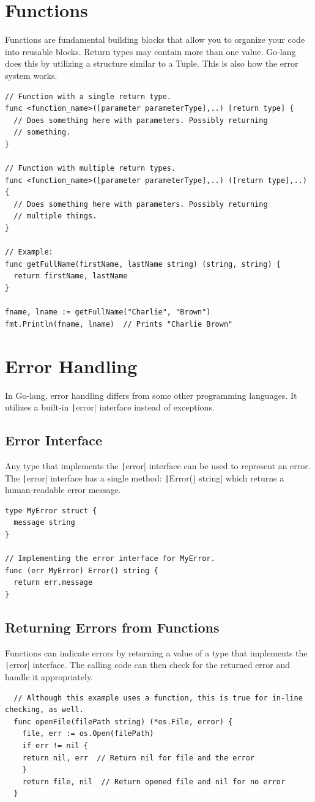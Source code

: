 \documentclass[letterpaper,12pt]{article}
\begin{document}
\newpage

\section{Functions}
Functions are fundamental building blocks that allow you to organize your code into reusable blocks. Return types may contain more than one value. Go-lang does this by utilizing a structure similar to a Tuple. This is also how the error system works.
\begin{verbatim}
// Function with a single return type.
func <function_name>([parameter parameterType],..) [return type] {
  // Does something here with parameters. Possibly returning
  // something.
}

// Function with multiple return types.
func <function_name>([parameter parameterType],..) ([return type],..) {
  // Does something here with parameters. Possibly returning
  // multiple things.
}

// Example:
func getFullName(firstName, lastName string) (string, string) {
  return firstName, lastName
}

fname, lname := getFullName("Charlie", "Brown")
fmt.Println(fname, lname)  // Prints "Charlie Brown"
\end{verbatim}
\section{Error Handling}
In Go-lang, error handling differs from some other programming languages. It utilizes a built-in \texttt|error| interface instead of exceptions.
\subsection{Error Interface}
Any type that implements the \texttt|error| interface can be used to represent an error. The \texttt|error| interface has a single method: \texttt|Error() string| which returns a human-readable error message.
\begin{verbatim}
type MyError struct {
  message string
}

// Implementing the error interface for MyError.
func (err MyError) Error() string {
  return err.message
}
\end{verbatim}
\subsection{Returning Errors from Functions}
Functions can indicate errors by returning a value of a type that implements the \texttt|error| interface. The calling code can then check for the returned error and handle it appropriately.
\begin{verbatim}
  // Although this example uses a function, this is true for in-line checking, as well.
  func openFile(filePath string) (*os.File, error) {
    file, err := os.Open(filePath)
    if err != nil {
    return nil, err  // Return nil for file and the error
    }
    return file, nil  // Return opened file and nil for no error
  }
\end{verbatim}
\end{document}
